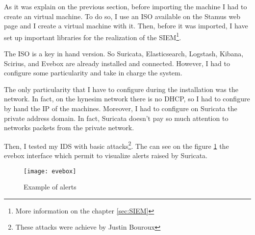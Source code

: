 As it was explain on the previous section, before importing the machine I had to create an virtual machine. To do
so, I use an ISO available on the Stamus web page \cite{stamusnetworks:_selks} and I create a virtual machine with
it. Then, before it was imported, I have set up important libraries for the realization of the SIEM\footnote{More
  information on the chapter \ref{sec:SIEM}}.

The ISO is a key in hand version. So Suricata, Elasticsearch, Logstash, Kibana, Scirius, and Evebox are already
installed and connected. However, I had to configure some particularity and take in charge the system.

The only particularity that I have to configure during the installation was the network. In fact, on the hynesim
network there is no DHCP, so I had to configure by hand the IP of the machines. Moreover, I had to configure on
Suricata the private address domain. In fact, Suricata doesn't pay so much attention to networks packets from the
private network.

Then, I tested my IDS with basic attacks\footnote{These attacks were achieve by Justin Bouroux}. The can see on the
figure \ref{fig:evebox} the evebox interface which permit to visualize alerts raised by Suricata.

\begin{figure}[h]
  \centering
  \texttt{[image: evebox]}
  \caption{Example of alerts}
  \label{fig:evebox}
\end{figure}


